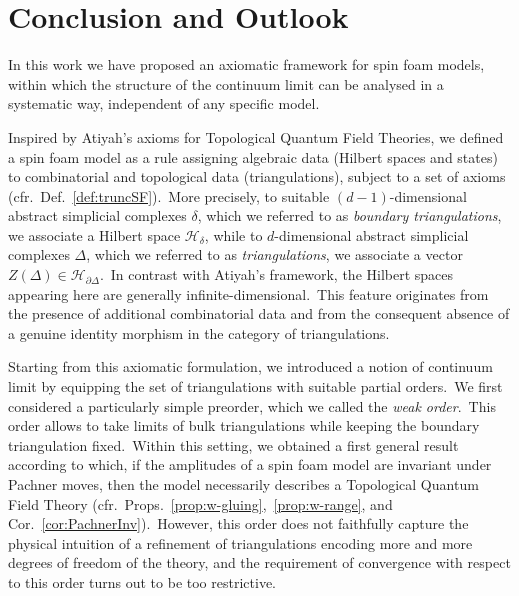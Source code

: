 \documentclass[11pt]{article}
\theoremstyle{definition}
\numberwithin{equation}{section}
\begin{document}
\section{Conclusion and Outlook}\label{Sec:conclusion}

In this work we have proposed an axiomatic framework for spin foam models, within which the structure of the continuum limit can be analysed in a systematic way, independent of any specific model.

Inspired by Atiyah’s axioms for Topological Quantum Field Theories, we defined a spin foam model as a rule assigning algebraic data (Hilbert spaces and states) to combinatorial and topological data (triangulations), subject to a set of axioms (cfr.~Def.~\ref{def:truncSF}).~More precisely, to suitable $(d-1)$-dimensional abstract simplicial complexes $\delta$, which we referred to as \emph{boundary triangulations}, we associate a Hilbert space $\mathcal{H}_\delta$, while to $d$-dimensional abstract simplicial complexes $\Delta$, which we referred to as \emph{triangulations}, we associate a vector $Z(\Delta)\in\mathcal{H}_{\partial\Delta}$.~In contrast with Atiyah's framework, the Hilbert spaces appearing here are generally infinite-dimensional.~This feature originates from the presence of additional combinatorial data and from the consequent absence of a genuine identity morphism in the category of triangulations.

Starting from this axiomatic formulation, we introduced a notion of continuum limit by equipping the set of triangulations with suitable partial orders.~We first considered a particularly simple preorder, which we called the \emph{weak order}.~This order allows to take limits of bulk triangulations while keeping the boundary triangulation fixed.~Within this setting, we obtained a first general result according to which, if the amplitudes of a spin foam model are invariant under Pachner moves, then the model necessarily describes a Topological Quantum Field Theory (cfr.~Props.~\ref{prop:w-gluing},~\ref{prop:w-range}, and Cor.~\ref{cor:PachnerInv}).~However, this order does not faithfully capture the physical intuition of a refinement of triangulations encoding more and more degrees of freedom of the theory, and the requirement of convergence with respect to this order turns out to be too restrictive.
\end{document}
